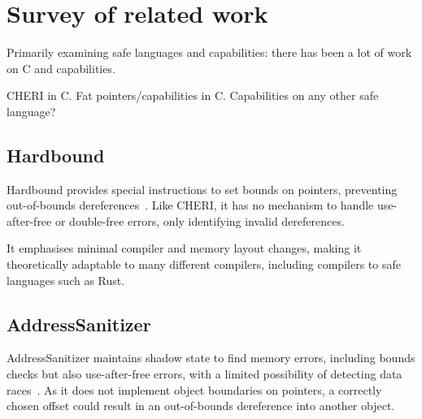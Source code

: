 \documentclass[dissertation.tex]{subfiles}
\begin{document}
\section{Survey of related work}
\label{sec:bg-related}

Primarily examining safe languages and capabilities: there has been a
lot of work on C and capabilities.


CHERI in C.
Fat pointers/capabilities in C.
Capabilities on any other safe language?






\subsection{Hardbound}
\label{sec:rel-hardbound}

Hardbound provides special instructions to set bounds on pointers,
preventing out-of-bounds dereferences~\cite{devietti-hardbound}.
Like CHERI, it has no mechanism to handle use-after-free or double-free
errors, only identifying invalid dereferences.

It emphasises minimal compiler and memory layout changes, making it
theoretically adaptable to many different compilers, including compilers
to safe languages such as Rust.



\subsection{AddressSanitizer}
\label{sec:rel-asan}

AddressSanitizer maintains shadow state to find memory errors, including
bounds checks but also use-after-free errors, with a limited possibility
of detecting data races~\cite{serebryany-asan}.
As it does not implement object boundaries on pointers, a correctly
chosen offset could result in an out-of-bounds dereference into another
object.
\end{document}
